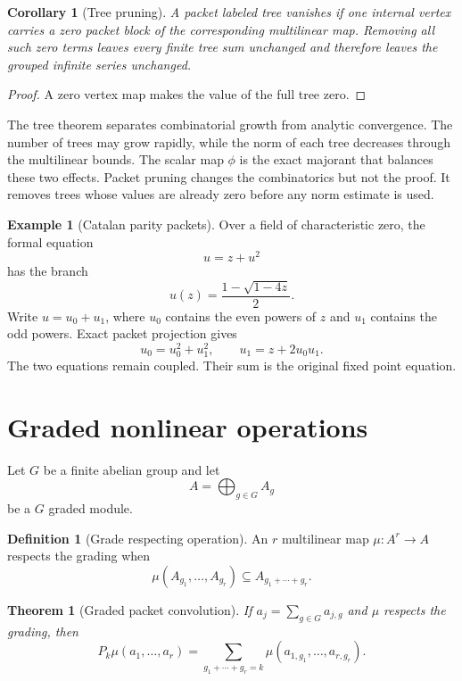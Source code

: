 \documentclass[11pt,a4paper]{article}
\newtheorem{theorem}{Theorem}[section]
\theoremstyle{plain}
\newtheorem{corollary}[corollary]{Corollary}
\theoremstyle{definition}
\newtheorem{definition}[definition]{Definition}
\newtheorem{example}[example]{Example}
\theoremstyle{remark}
\begin{document}
\begin{corollary}[Tree pruning]\label{cor:tree_pruning}
A packet labeled tree vanishes if one internal vertex carries a zero packet block of the corresponding multilinear map.  Removing all such zero terms leaves every finite tree sum unchanged and therefore leaves the grouped infinite series unchanged.
\end{corollary}

\begin{proof}
A zero vertex map makes the value of the full tree zero.
\end{proof}


The tree theorem separates combinatorial growth from analytic convergence.  The number of trees may grow rapidly, while the norm of each tree decreases through the multilinear bounds.  The scalar map $\phi$ is the exact majorant that balances these two effects.  Packet pruning changes the combinatorics but not the proof.  It removes trees whose values are already zero before any norm estimate is used.

\begin{example}[Catalan parity packets]\label{ex:catalan_parity}
Over a field of characteristic zero, the formal equation
\[
u=z+u^2
\]
has the branch
\[
u(z)=\frac{1-\sqrt{1-4z}}2.
\]
Write $u=u_0+u_1$, where $u_0$ contains the even powers of $z$ and $u_1$ contains the odd powers.  Exact packet projection gives
\[
u_0=u_0^2+u_1^2,
\qquad
u_1=z+2u_0u_1.
\]
The two equations remain coupled.  Their sum is the original fixed point equation.
\end{example}

\section{Graded nonlinear operations}\label{sec:graded_operations}

Let $G$ be a finite abelian group and let
\[
A=\bigoplus_{g\in G}A_g
\]
be a $G$ graded module.

\begin{definition}[Grade respecting operation]\label{def:grade_respecting}
An $r$ multilinear map $\mu:A^r\to A$ respects the grading when
\[
\mu(A_{g_1},\ldots,A_{g_r})
\subseteq
A_{g_1+\cdots+g_r}.
\]
\end{definition}

\begin{theorem}[Graded packet convolution]\label{thm:graded_convolution}
If $a_j=\sum_{g\in G}a_{j,g}$ and $\mu$ respects the grading, then
\[
P_k\mu(a_1,\ldots,a_r)
=
\sum_{g_1+\cdots+g_r=k}
\mu(a_{1,g_1},\ldots,a_{r,g_r}).
\]
\end{theorem}
\end{document}

